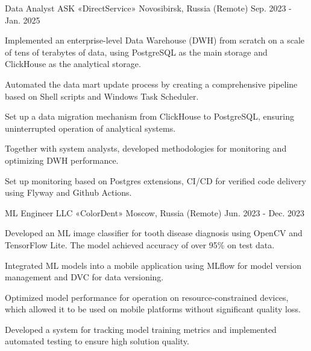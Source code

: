 \begin{cventries}
  \cventry
    {Data Analyst} %
    {ASK «DirectService»} %
    {Novosibirsk, Russia (Remote)} %
    {Sep. 2023 - Jan. 2025} %
    {
      \begin{cvitems} %
        \item {Implemented an enterprise-level Data Warehouse (DWH) from scratch on a scale of tens of terabytes of data, using PostgreSQL as the main storage and ClickHouse as the analytical storage.}
        \item {Automated the data mart update process by creating a comprehensive pipeline based on Shell scripts and Windows Task Scheduler.}
        \item {Set up a data migration mechanism from ClickHouse to PostgreSQL, ensuring uninterrupted operation of analytical systems.}
        \item {Together with system analysts, developed methodologies for monitoring and optimizing DWH performance.}
        \item {Set up monitoring based on Postgres extensions, CI/CD for verified code delivery using Flyway and Github Actions.}
      \end{cvitems}
    }

  \cventry
    {ML Engineer} %
    {LLC «ColorDent»} %
    {Moscow, Russia (Remote)} %
    {Jun. 2023 - Dec. 2023} %
    {
      \begin{cvitems} %
        \item {Developed an ML image classifier for tooth disease diagnosis using OpenCV and TensorFlow Lite. The model achieved accuracy of over 95\% on test data.}
        \item {Integrated ML models into a mobile application using MLflow for model version management and DVC for data versioning.}
        \item {Optimized model performance for operation on resource-constrained devices, which allowed it to be used on mobile platforms without significant quality loss.}
        \item {Developed a system for tracking model training metrics and implemented automated testing to ensure high solution quality.}
      \end{cvitems}
    }

\end{cventries}
